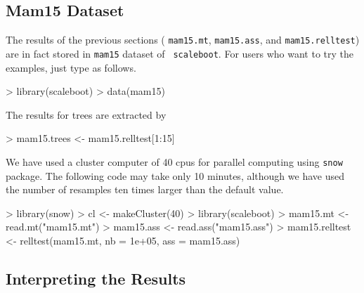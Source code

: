 \documentclass[a4paper]{amsart}
\begin{document}
\subsection{Mam15 Dataset}

The results of the previous sections (
{\tt mam15.mt}, {\tt mam15.ass}, and
{\tt mam15.relltest}) are in fact stored in {\tt mam15} dataset of {\tt
scaleboot}. For users who want to try the examples, just type as follows.
\begin{Schunk}
\begin{Sinput}
> library(scaleboot)
> data(mam15)
\end{Sinput}
\end{Schunk}

The results for trees are extracted by
\begin{Schunk}
\begin{Sinput}
> mam15.trees <- mam15.relltest[1:15]
\end{Sinput}
\end{Schunk}

We have used a cluster computer of 40 cpus for parallel computing
using {\tt snow} package.  The following code may take only 10
minutes, although we have used the number of resamples ten times
larger than the default value.
\begin{Schunk}
\begin{Sinput}
> library(snow)
> cl <- makeCluster(40)
> library(scaleboot)
> mam15.mt <- read.mt("mam15.mt")
> mam15.ass <- read.ass("mam15.ass")
> mam15.relltest <- relltest(mam15.mt, nb = 1e+05, ass = mam15.ass)
\end{Sinput}
\end{Schunk}

\subsection{Interpreting the Results}
\end{document}
